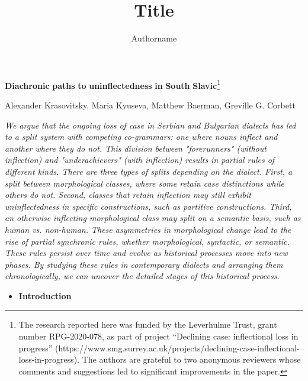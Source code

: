 \documentclass[output=paper]{langscibook}
\author{Authorname\orcid{}\affiliation{}}
\title{Title}
\begin{document}
\maketitle 


\textbf{Diachronic} \textbf{paths} \textbf{to} \textbf{uninflectedness} \textbf{in} \textbf{South} \textbf{Slavic}\footnote{The research reported here was funded by the Leverhulme Trust, grant number RPG-2020-078, as part of project “Declining case: inflectional loss in progress” (https://www.smg.surrey.ac.uk/projects/declining-case-inflectional-loss-in-progress). The authors are grateful to two anonymous reviewers whose comments and suggestions led to significant improvements in the paper.}

Alexander Krasovitsky, Maria Kyuseva, Matthew Baerman, Greville G. Corbett

\textit{We argue that the ongoing loss of case in Serbian and Bulgarian dialects has led to a split system with competing co-grammars: one where nouns inflect and another where they do not. This division between "forerunners" (without inflection) and "underachievers" (with inflection) results in partial rules of different kinds. There are three types of splits depending on the dialect. First, a split between morphological classes, where some retain case distinctions while others do not. Second, classes that retain inflection may still exhibit uninflectedness in specific constructions, such as partitive constructions. Third, an otherwise inflecting morphological class may split on a semantic basis, such as human vs. non-human. These asymmetries in morphological change lead to the rise of partial synchronic rules, whether morphological, syntactic, or semantic. These rules persist over time and evolve as historical processes move into new phases. By studying these rules in contemporary dialects and arranging them chronologically, we can uncover the detailed stages of this historical process.}

\begin{itemize}
\item \begin{styleListParagraph}
\textbf{Introduction}
\end{styleListParagraph}
\end{itemize}
\end{document}
